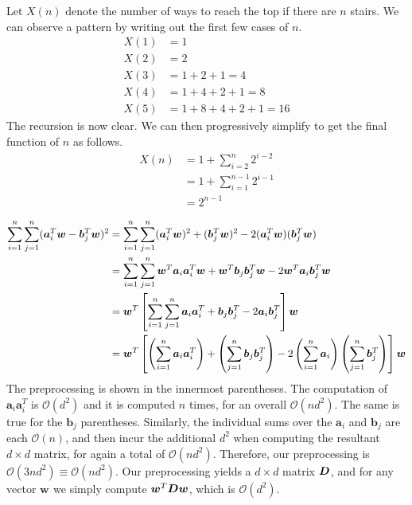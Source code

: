 \documentclass[11pt]{article}
\renewcommand\vec[2][]{\bm{#2}_{#1}}
\newcommand\p{\Needspace{10\baselineskip} \noindent}
\begin{document}
Let $X(n)$ denote the number of ways to reach the top if there are $n$ stairs. We can observe a pattern by writing out the first few cases of $n$. 
\begin{align}
	X(1) &= 1 \\
	X(2) &= 2 \\
	X(3) &= 1 + 2 + 1 = 4  \\
	X(4) &= 1 + 4 + 2 + 1 = 8 \\
	X(5) &= 1 + 8 + 4 + 2 + 1 = 16
\end{align}
The recursion is now clear. We can then progressively simplify to get the final function of $n$ as follows. 
\begin{align}
	X(n)  &= 1 + \sum_{i=2}^{n} 2^{i - 2} \\
	&= 1 + \sum_{i=1}^{n -1} 2^{i - 1} \\
	&= 2^{n - 1}
\end{align}



\clearpage
\p {} 

\begin{align}
	\insum \jnsum (\vec[i]{a}^T \vec w - \vec[j]{b}^T \vec w)^2
		&= \insum \jnsum (\vec[i]{a}^T \vec w)^2 + (\vec[j]{b}^T \vec w)^2 - 2 (\vec[i]{a}^T \vec w)(\vec[j]{b}^T \vec w) \\
		&= \insum \jnsum \vec{w}^T \vec[i]{a} \vec[i]{a}^T \vec{w} + \vec{w}^T \vec[j]{b} \vec[j]{b}^T \vec{w} - 2 \vec{w}^T \vec[i]{a} \vec[j]{b}^T \vec{w} \\
		&= \vec{w}^T \left[
			\insum \jnsum \vec[i]{a} \vec[i]{a}^T
			+ \vec[j]{b} \vec[j]{b}^T
			- 2 \vec[i]{a} \vec[j]{b}^T 
		\right] \vec{w} \\
		&= \vec{w}^T \left[
			\left( \insum \vec[i]{a} \vec[i]{a}^T \right)
			+ \left( \jnsum  \vec[j]{b} \vec[j]{b}^T \right)
			- 2  \left( \insum \vec[i]{a}  \right) \left( \jnsum \vec[j]{b}^T \right) 
			\right] \vec{w} \\
\end{align}
The preprocessing is shown in the innermost parentheses. The computation of $\vec[i]{a}\vec[i]{a}^T$ is $\mathcal{O}(d^2)$ and it is computed $n$ times, for an overall $\mathcal{O}(nd^2)$. The same is true for the $\vec[j]{b}$ parentheses. Similarly, the individual sums over the $\vec[i]{a}$ and $\vec[j]{b}$ are each $\mathcal{O}(n)$, and then incur the additional $d^2$ when computing the resultant $d \times d$ matrix, for again a total of $\mathcal{O}(nd^2)$. Therefore, our preprocessing is $\mathcal{O}(3nd^2) \equiv \mathcal{O}(nd^2)$.  Our preprocessing yields a $d \times d$ matrix $\bm{D}_{}$, and for any vector $\vec w$ we simply compute $\vec{w}^T \matr D \vec w$, which is $\mathcal{O}(d^2)$.  
\end{document}
